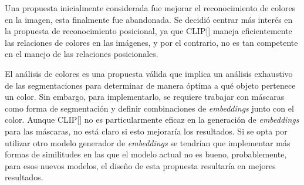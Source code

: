 Una propuesta inicialmente considerada fue mejorar el reconocimiento de colores en la imagen, esta finalmente fue abandonada. Se decidió centrar más interés en la propuesta de reconocimiento posicional, ya que CLIP[\cite{clip}] maneja eficientemente las relaciones de colores en las imágenes, y por el contrario, no es tan competente en el manejo de las relaciones posicionales.

El análisis de colores es una propuesta válida que implica un análisis exhaustivo de las segmentaciones para determinar de manera óptima a qué objeto pertenece un color. Sin embargo, para implementarlo, se requiere trabajar con máscaras como forma de segmentación y definir combinaciones de \textit{embeddings} junto con el color. Aunque CLIP[\cite{clip}] no es particularmente eficaz en la generación de \textit{embeddings} para las máscaras, no está claro si esto mejoraría los resultados. Si se opta por utilizar otro modelo generador de \textit{embeddings} se tendrían que implementar más formas de similitudes en las que el modelo actual no es bueno, probablemente, para esos nuevos modelos, el dise\~no de esta propuesta resultaría en mejores resultados.

